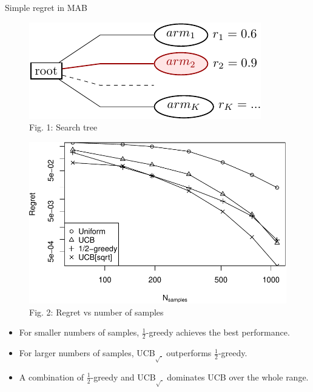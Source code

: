 \documentclass{beamer}
\begin{document}
\begin{frame}{Simple regret in MAB}

\begin{figure}[h]
  \begin{minipage}[c]{0.4\linewidth}
    \centering
    \includegraphics[scale=0.65]{onelevel-tree.pdf}\\
    {\tiny Fig. 1: Search tree}
  \end{minipage}
  \begin{minipage}[c]{0.4\linewidth}
    \centering
    \includegraphics[scale=0.4]{flat-trilevel-k=64-uqb=8.pdf}\\
    {\tiny Fig. 2: Regret vs number of samples}
  \end{minipage}
  \label{fig:mab-simple-regret}
\end{figure}
\begin{itemize}
\item For smaller numbers of
samples, $\frac 1 2$-greedy achieves the best
performance.
\item For larger numbers of samples, UCB$_{\sqrt{\cdot}}$
outperforms $\frac 1 2$-greedy. 
\item A combination of $\frac 1
2$-greedy  and UCB$_{\sqrt{\cdot}}$ dominates UCB over the
whole range.
\end{itemize}
\end{frame}
\end{document}
